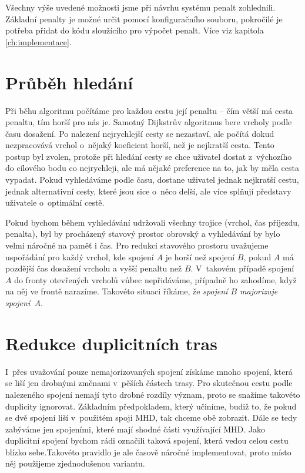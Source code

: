 Všechny výše uvedené možnosti jsme při návrhu systému penalt zohlednili.
Základní penalty je možné určit pomocí konfiguračního souboru, pokročilé je
potřeba přidat do kódu sloužícího pro výpočet penalt. Více viz kapitola
\ref{ch:implementace}.

\section{Průběh hledání}
Při běhu algoritmu počítáme pro každou cestu její penaltu -- čím větší má
cesta penaltu, tím horší pro nás je. Samotný Dijkstrův algoritmus bere vrcholy
podle času dosažení. Po nalezení nejrychlejší cesty se nezastaví, ale počítá
dokud nezpracovává vrchol o~nějaký koeficient horší, než je nejkratší cesta. 
Tento postup byl zvolen, protože při hledání cesty se chce uživatel dostat z~výchozího
do cílového bodu co nejrychleji, ale má nějaké preference na to, jak by měla
cesta vypadat. Pokud vyhledáváme podle času, dostane uživatel jednak nejkratší
cestu, jednak alternativní cesty, které jsou sice o~něco delší, ale více splňují
představy uživatele o~optimální cestě.

Pokud bychom během vyhledávání udržovali všechny trojice (vrchol, čas příjezdu,
penalta), byl by procházený stavový prostor obrovský a vyhledávání by bylo velmi
náročné na paměť i čas. Pro redukci stavového prostoru uvažujeme uspořádání pro
každý vrchol, kde spojení $A$ je horší než spojení $B$, pokud $A$ má pozdější
čas dosažení vrcholu a vyšší penaltu než $B$. V~takovém případě spojení $A$ do
fronty otevřených vrcholů vůbec nepřidáváme, případně ho zahodíme, když na něj
ve frontě narazíme. Takovéto situaci říkáme, že {\em spojení $B$ majorizuje
spojení~$A$}.

\section{Redukce duplicitních tras}
I~přes uvažování pouze nemajorizovaných spojení získáme mnoho spojení, která se
liší jen drobnými změnami v~pěších částech trasy. Pro skutečnou cestu podle
nalezeného spojení nemají tyto drobné rozdíly význam, proto se snažíme takovéto
duplicity ignorovat. Základním předpokladem, který učiníme, budiž to, že pokud
se dvě spojení liší v~použitém spoji MHD, tak chceme obě zobrazit. Dále se tedy
zabýváme jen spojeními, které mají shodné části využívající MHD. Jako duplicitní
spojení bychom rádi označili taková spojení, která vedou celou cestu blízko
sebe.Takovéto pravidlo je ale časově náročné implementovat, proto místo něj použijeme
zjednodušenou variantu.

